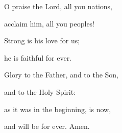 \noindent O praise the Lord, all you nations,~\GreStar{}~\nopagebreak

acclaim him, all you peoples!

\noindent Strong is his love for us;~\GreStar{}~\nopagebreak

he is faithful for ever.

\noindent Glory to the Father, and to the Son,~\GreStar{}~\nopagebreak

and to the Holy Spirit:

\noindent as it was in the beginning, is now,~\GreStar{}~\nopagebreak

and will be for ever. Amen.
